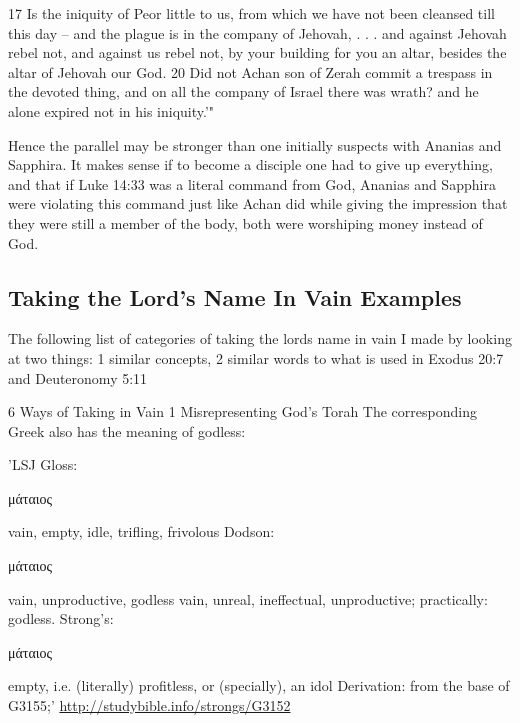 \documentclass[11pt]{article}
\begin{document}
17 Is the iniquity of Peor little to us, from which we have not been cleansed till this day -- and the plague is in the company of Jehovah, . . .  and against Jehovah rebel not, and against us rebel not, by your building for you an altar, besides the altar of Jehovah our God.
20 Did not Achan son of Zerah commit a trespass in the devoted thing, and on all the company of Israel there was wrath? and he alone expired not in his iniquity.'"

Hence the parallel may be stronger than one initially suspects with Ananias and Sapphira. It makes sense if to become a disciple one had to give up everything, and that if Luke 14:33 was a literal command from God, Ananias and Sapphira were violating this command just like Achan did while giving the impression that they were still a member of the body, both were worshiping money instead of God.

\subsection{Taking the Lord's Name In Vain Examples}
The following list of categories of taking the lords name in vain I made by looking at two things: 1 similar concepts, 2 similar words to what is used in Exodus 20:7 and Deuteronomy 5:11

{\LARGE 6 Ways of Taking in Vain}\newline
{\Large 1 Misrepresenting God's Torah}\newline
The corresponding Greek also has the meaning of godless:\newline

'LSJ Gloss:\newline
\begin{greek}μάταιος\end{greek}\newline
vain, empty, idle, trifling, frivolous\newline
Dodson:\newline
\begin{greek}μάταιος\end{greek}\newline
vain, unproductive, godless\newline
vain, unreal, ineffectual, unproductive; practically: godless.\newline
Strong's:\newline
\begin{greek}μάταιος\end{greek}\newline
empty, i.e. (literally) profitless, or (specially), an idol\newline
Derivation: from the base of G3155;'\newline
\url{http://studybible.info/strongs/G3152}\newline
\end{document}
